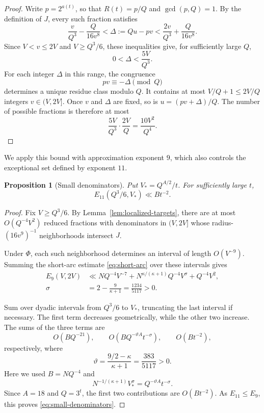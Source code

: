 \documentclass[11pt,reqno]{amsart}
\theoremstyle{definition}
\theoremstyle{plain}
\newtheorem{proposition}[lemma]{Proposition}
\theoremstyle{definition}
\theoremstyle{remark}
\begin{document}
\begin{proof}
Write $p=2^{a(t)}$, so that $R(t)=p/Q$ and
$\gcd(p,Q)=1$. By the definition of $J$, every such
fraction satisfies
\[
 \frac{v}{Q^3}-\frac{Q}{16v^8}
 <\Delta:=Qu-pv
 <\frac{2v}{Q^3}+\frac{Q}{16v^8}.
\]
Since $V<v\le2V$ and $V\ge Q^3/6$, these inequalities
give, for sufficiently large $Q$,
\[
 0<\Delta<\frac{5V}{Q^3}.
\]
For each integer $\Delta$ in this range, the congruence
\[
 pv\equiv-\Delta\pmod Q
\]
determines a unique residue class modulo $Q$.
It contains at most $V/Q+1\le2V/Q$ integers
$v\in(V,2V]$. Once $v$ and $\Delta$ are fixed,
so is $u=(pv+\Delta)/Q$.
The number of possible fractions is therefore at most
\[
 \frac{5V}{Q^3}\cdot\frac{2V}{Q}
 =\frac{10V^2}{Q^4}.
\]
\end{proof}

We apply this bound with approximation exponent $9$,
which also controls the exceptional set defined by
exponent $11$.

\begin{proposition}[Small denominators]
\label{prop:small-denominators}
Put $V_*=Q^{A/2}/t$. For sufficiently large $t$,
\begin{equation}\label{eq:small-denominators}
 E_{11}(Q^3/6,V_*)\ll Bt^{-2}.
\end{equation}
\end{proposition}

\begin{proof}
Fix $V\ge Q^3/6$. By
Lemma~\ref{lem:localized-targets}, there are at most
$O(Q^{-4}V^2)$ reduced fractions with denominators
in $(V,2V]$ whose radius-$(16v^9)^{-1}$
neighborhoods intersect $J$.

Under $\Phi$, each such neighborhood determines an
interval of length $O(V^{-9})$. Summing the short-arc
estimate \eqref{eq:short-arc} over these intervals gives
\[
 \begin{aligned}
 E_9(V,2V)
 &\ll NQ^{-4}V^{-7}
 +N^{\kappa/(\kappa+1)}Q^{-4}V^\sigma
 +Q^{-4}V^2,\\
 \sigma&=2-\frac9{\kappa+1}
 =\frac{1234}{5117}>0.
 \end{aligned}
\]

Sum over dyadic intervals from $Q^3/6$ to $V_*$,
truncating the last interval if necessary.
The first term decreases geometrically, while
the other two increase. The sums of the three terms are
\[
 O(BQ^{-21}),\qquad
 O(BQ^{-\vartheta A}t^{-\sigma}),\qquad
 O(Bt^{-2}),
\]
respectively, where
\[
 \vartheta=\frac{9/2-\kappa}{\kappa+1}
 =\frac{383}{5117}>0.
\]
Here we used $B=NQ^{-4}$ and
\[
 N^{-1/(\kappa+1)}V_*^\sigma
 =Q^{-\vartheta A}t^{-\sigma}.
\]
Since $A=18$ and $Q=3^t$, the first two
contributions are $O(Bt^{-2})$.
As $E_{11}\le E_9$, this proves
\eqref{eq:small-denominators}.
\end{proof}
\end{document}
